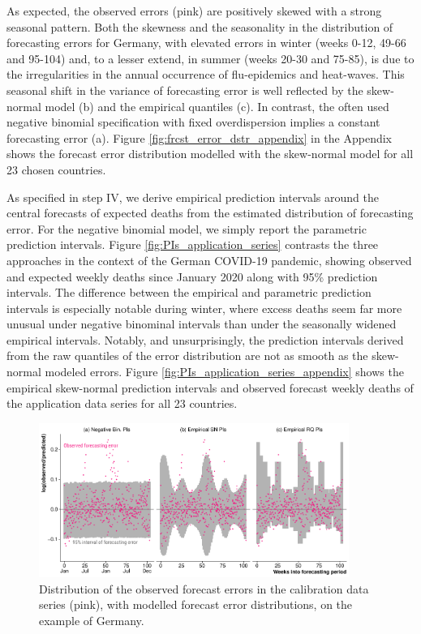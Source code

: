 \documentclass[12pt]{article}
\begin{document}
As expected, the observed errors (pink) are positively skewed with a strong seasonal pattern. Both the skewness and the seasonality in the distribution of forecasting errors for Germany, with elevated errors in winter (weeks 0-12, 49-66 and 95-104) and, to a lesser extend, in summer (weeks 20-30 and 75-85), is due to the irregularities in the annual occurrence of flu-epidemics and heat-waves. This seasonal shift in the variance of forecasting error is well reflected by the skew-normal model (b) and the empirical quantiles (c). In contrast, the often used negative binomial specification with fixed overdispersion implies a constant forecasting error (a). Figure \ref{fig:frcst_error_dstr_appendix} in the Appendix shows the forecast error distribution modelled with the skew-normal model for all 23 chosen countries.

As specified in step IV, we derive empirical prediction intervals around the central forecasts of expected deaths from the estimated distribution of forecasting error. For the negative binomial model, we simply report the parametric prediction intervals. Figure \ref{fig:PIs_application_series} contrasts the three approaches in the context of the German COVID-19 pandemic, showing observed and expected weekly deaths since January 2020 along with 95\% prediction intervals. The difference between the empirical and parametric prediction intervals is especially notable during winter, where excess deaths seem far more unusual under negative binominal intervals than under the seasonally widened empirical intervals. Notably, and unsurprisingly, the prediction intervals derived from the raw quantiles of the error distribution are not as smooth as the skew-normal modeled errors. Figure \ref{fig:PIs_application_series_appendix} shows the empirical skew-normal prediction intervals and observed forecast weekly deaths of the application data series for all 23 countries.

\begin{figure}[ht!]
    \centering
    \includegraphics[width=0.9\textwidth]{fig/20-calibration.pdf}
     \caption{Distribution of the observed forecast errors in the calibration data series (pink), with modelled forecast error distributions, on the example of Germany.}
     \label{fig:20-calibration}
\end{figure}
\end{document}
